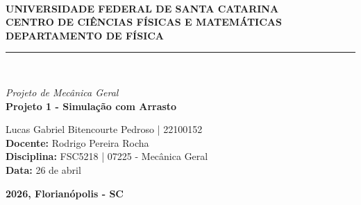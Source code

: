 
\begin{titlepage}
    \centering
    \\[0.3cm]
    {\textbf{
        UNIVERSIDADE FEDERAL DE SANTA CATARINA\\
        CENTRO DE CIÊNCIAS FÍSICAS E MATEMÁTICAS\\
        DEPARTAMENTO DE FÍSICA
    }}\\
    \rule{\textwidth}{0.5mm}\\ %
    \vfill

    {\LARGE \textit{Projeto de Mecânica Geral}}\\[2em]
    {\LARGE \textbf{Projeto 1 - Simulação com Arrasto}}\\[5cm]

    \begin{flushleft}
        {
            Lucas Gabriel Bitencourte Pedroso | 22100152
        }\\\bigskip
        {\textbf{Docente:} Rodrigo Pereira Rocha}\\\smallskip
        {\textbf{Disciplina:} FSC5218 | 07225 - Mecânica Geral}\\\smallskip
        {\textbf{Data:} 26 de abril}
    \end{flushleft}

    \vfill
    {\textbf{2026, Florianópolis - SC}}

\end{titlepage}

